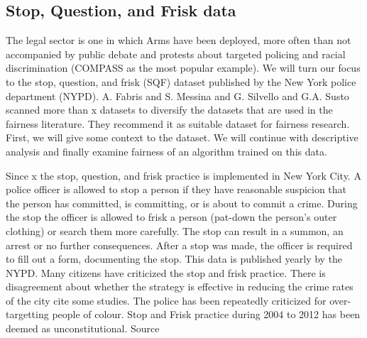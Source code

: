\subsection*{Stop, Question, and Frisk data}

The legal sector is one in which Arms have been deployed, more often than not accompanied by public debate and protests about targeted policing and racial discrimination (COMPASS as the most popular example). We will turn our focus to the stop, question, and frisk (SQF) dataset published by the New York police department (NYPD). A. Fabris and S. Messina and G. Silvello and G.A. Susto scanned more than x datasets to diversify the datasets that are used in the fairness literature. They recommend it as suitable dataset for fairness research. First, we will give some context to the dataset. We will continue with descriptive analysis and finally examine fairness of an algorithm trained on this data.

Since x the stop, question, and frisk practice is implemented in New York City. A police officer is allowed to stop a person if they have reasonable suspicion that the person has committed, is committing, or is about to commit a crime.
During the stop the officer is allowed to frisk a person (pat-down the person's outer clothing) or search them more carefully.
The stop can result in a summon, an arrest or no further consequences. After a stop was made, the officer is required to fill out a form, documenting the stop. This data is published yearly by the NYPD.
Many citizens have criticized the stop and frisk practice. There is disagreement about whether the strategy is effective in reducing the crime rates of the city {\color{red}cite some studies}. The police has been repeatedly criticized for over-targetting people of colour.
Stop and Frisk practice during 2004 to 2012 has been deemed as unconstitutional. {\color{red} Source}

